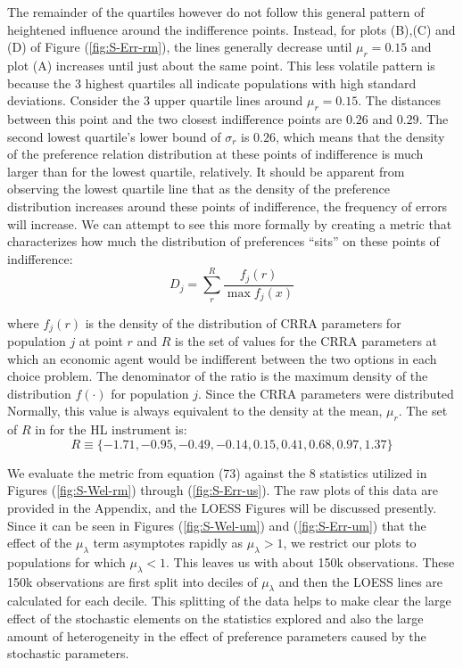 \documentclass[../main.tex]{subfiles}
\begin{document}
The remainder of the quartiles however do not follow this general pattern of heightened influence around the indifference points.
Instead, for plots (B),(C) and (D) of Figure (\ref{fig:S-Err-rm}), the lines generally decrease until $\mu_r = 0.15$ and plot (A) increases until just about the same point.
This less volatile pattern is because the 3 highest quartiles all indicate populations with high standard deviations.
Consider the 3 upper quartile lines around $\mu_r = 0.15$.
The distances between this point and the two closest indifference points are $0.26$ and $0.29$.
The second lowest quartile's lower bound of $\sigma_r$ is $0.26$, which means that the density of the preference relation distribution at these points of indifference is much larger than for the lowest quartile, relatively.
It should be apparent from observing the lowest quartile line that as the density of the preference distribution increases around these points of indifference, the frequency of errors will increase.
We can attempt to see this more formally by creating a metric that characterizes how much the distribution of preferences \enquote{sits} on these points of indifference:
\begin{equation}
	\label{eq:Dstat}
	D_j = \sum_r^R \frac{f_j(r)}{\max f_j(x)}
\end{equation}

\noindent where $f_j(r)$ is the density of the distribution of CRRA parameters for population $j$ at point $r$ and $R$ is the set of values for the CRRA parameters at which an economic agent would be indifferent between the two options in each choice problem.
The denominator of the ratio is the maximum density of the distribution $f(\cdot)$ for population $j$.
Since the CRRA parameters were distributed Normally, this value is always equivalent to the density at the mean, $\mu_r$.
The set of $R$ in for the HL instrument is:
\begin{equation}
	R \equiv \{-1.71, -0.95, -0.49, -0.14, 0.15, 0.41, 0.68, 0.97, 1.37\}
\end{equation}

We evaluate the metric from equation (73) against the 8 statistics utilized in Figures (\ref{fig:S-Wel-rm}) through (\ref{fig:S-Err-us}).
The raw plots of this data are provided in the Appendix, and the LOESS Figures will be discussed presently.
Since it can be seen in Figures (\ref{fig:S-Wel-um}) and (\ref{fig:S-Err-um}) that the effect of the $\mu_\lambda$ term asymptotes rapidly as $\mu_\lambda > 1$, we restrict our plots to populations for which $\mu_\lambda < 1$.
This leaves us with about 150k observations.
These 150k observations are first split into deciles of $\mu_\lambda$ and then the LOESS lines are calculated for each decile.
This splitting of the data helps to make clear the large effect of the stochastic elements on the statistics explored and also the large amount of heterogeneity in the effect of preference parameters caused by the stochastic parameters.
\end{document}
